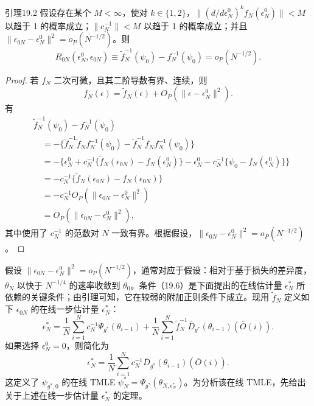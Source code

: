 \begin{bookresult}{引理}{19.2}
假设存在某个 $M<\infty$，使对 $k\in\{1,2\}$，$\|({d}/{d\epsilon_N^0})^k f_N(\epsilon_N^0)\|<M$ 以趋于 1 的概率成立；$\|c_N^{-1}\|<M$ 以趋于 1 的概率成立；并且 $\|\epsilon_{0N}-\epsilon_N^0\|^2=o_P(N^{-1/2})$。则
\begin{equation}
 R_{0N}(\epsilon_N^0,\epsilon_{0N})
 \equiv\tilde f_N^{-1}(\psi_0)-f_N^{-1}(\psi_0)=o_P(N^{-1/2}).
 \tag{19.6}
\end{equation}
\end{bookresult}

\begin{proof}
若 $f_N$ 二次可微，且其二阶导数有界、连续，则
\[
 f_N(\epsilon)=\tilde f_N(\epsilon)+O_P(\|\epsilon-\epsilon_N^0\|^2).
\]
有
\[
\begin{aligned}
 &\tilde f_N^{-1}(\psi_0)-f_N^{-1}(\psi_0)\\
 &\quad=-\{\tilde f_N^{-1}\tilde f_N f_N^{-1}(\psi_0)
 -\tilde f_N^{-1}f_N f_N^{-1}(\psi_0)\}\\
 &\quad=-\{\epsilon_N^0+c_N^{-1}\{\tilde f_N(\epsilon_{0N})-f_N(\epsilon_N^0)\}
 -\epsilon_N^0-c_N^{-1}\{\psi_0-f_N(\epsilon_N^0)\}\}\\
 &\quad=-c_N^{-1}\{\tilde f_N(\epsilon_{0N})-f_N(\epsilon_{0N})\}\\
 &\quad=-c_N^{-1}O_P(\|\epsilon_{0N}-\epsilon_N^0\|^2)\\
 &\quad=O_P(\|\epsilon_{0N}-\epsilon_N^0\|^2),
\end{aligned}
\]
其中使用了 $c_N^{-1}$ 的范数对 $N$ 一致有界。根据假设，$\|\epsilon_{0N}-\epsilon_N^0\|^2=o_P(N^{-1/2})$。
\end{proof}

假设 $\|\epsilon_{0N}-\epsilon_N^0\|^2=o_P(N^{-1/2})$，通常对应于假设：相对于基于损失的差异度，$\theta_N$ 以快于 $N^{-1/4}$ 的速率收敛到 $\theta_0$。条件（19.6）是下面提出的在线估计量 $\epsilon_N^*$ 所依赖的关键条件；由引理可知，它在较弱的附加正则条件下成立。现用 $\tilde f_N$ 定义如下 $\epsilon_{0N}$ 的在线一步估计量 $\epsilon_N^*$：
\[
 \epsilon_N^*=\frac1N\sum_{i=1}^N c_N^{-1}\Psi_{g^*}(\theta_{i-1})
 +\frac1N\sum_{i=1}^N\tilde f_N^{-1}\bar D_{g^*}(\theta_{i-1})(\bar O(i)).
\]
如果选择 $\epsilon_N^0=0$，则简化为
\[
 \epsilon_N^*=\frac1N\sum_{i=1}^N c_N^{-1}\bar D_{g^*}(\theta_{i-1})(\bar O(i)).
\]
这定义了 $\psi_{g^*,0}$ 的在线 TMLE $\psi_N^*=\Psi_{g^*}(\theta_{N,\epsilon_N^*})$。为分析该在线 TMLE，先给出关于上述在线一步估计量 $\epsilon_N^*$ 的定理。

